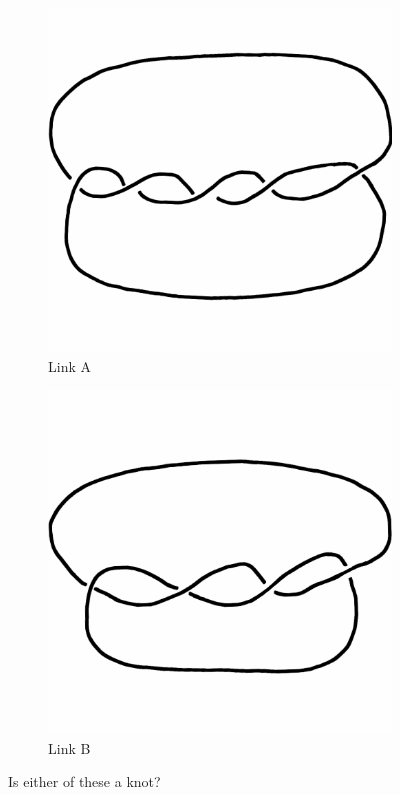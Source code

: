 \documentclass[12pt,letterpaper]{article}
\theoremstyle{definition}
\begin{document}
\begin{figure}[h]
     \centering
        \begin{subfigure}{.45\textwidth}
        \centering
        \includegraphics[width=\textwidth]{rgp10pics/twistknot.png}
        \caption{Link A}
    \end{subfigure}
    \quad
    \begin{subfigure}{.45\textwidth}
        \centering
        \includegraphics[width=\textwidth]{rgp10pics/twistlink.png}
        \caption{Link B}
    \end{subfigure}
    \caption{Is either of these a knot?}
\end{figure}
\end{document}
